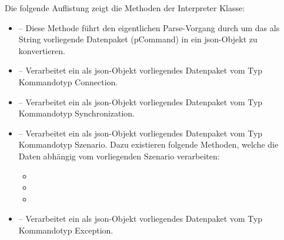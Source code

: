\newline
Die folgende Auflistung zeigt die Methoden der Interpreter Klasse:
\begin{itemize}
	\item{} -- Diese Methode führt den eigentlichen Parse-Vorgang durch um das als String
	vorliegende Datenpaket (pCommand) in ein \gls{json}-Objekt zu konvertieren.
	\item{} -- Verarbeitet ein als \gls{json}-Objekt vorliegendes Datenpaket vom Typ 
	Kommandotyp Connection.
	\item{} -- Verarbeitet ein als \gls{json}-Objekt vorliegendes Datenpaket vom 
	Typ Kommandotyp Synchronization.
	\item{} -- Verarbeitet ein als \gls{json}-Objekt vorliegendes Datenpaket vom Typ 
	Kommandotyp Szenario. Dazu existieren folgende Methoden, welche die Daten abhängig vom vorliegenden Szenario verarbeiten:
	\begin{itemize}
			\item{}
			\item{}
			\item{}
	\end{itemize}
	\item{} -- Verarbeitet ein als \gls{json}-Objekt vorliegendes Datenpaket vom Typ 
	Kommandotyp Exception.
\end{itemize}
